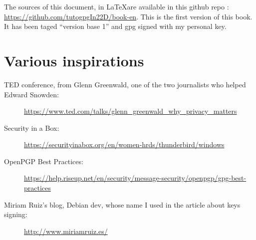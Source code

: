 \documentclass[10pt,a4paper,openany]{book}
\begin{document}
	The sources of this document, in \LaTeX are available in this github repo : \url{https://github.com/tutogpgIn22D/book-en}. This is the first version of this book. It has been taged ``version base 1'' and gpg signed with my personal key.
	
	\tableofcontents
	
	
	
	
		
	
	
	
	
	\chapter{Various inspirations}
	
	\begin{description}
		\item[TED conference, from Glenn Greenwald, one of the two journalists who helped Edward Snowden:] \url{https://www.ted.com/talks/glenn_greenwald_why_privacy_matters}
			
		\item[Security in a Box:]\url{https://securityinabox.org/en/women-hrds/thunderbird/windows}
		
		\item[OpenPGP Best Practices:]\url{https://help.riseup.net/en/security/message-security/openpgp/gpg-best-practices}
		
		\item[Miriam Ruiz's blog, Debian dev, whose name I used in the article about keys signing:]\url{http://www.miriamruiz.es/}\\
		
	\end{description}
	
\end{document}
